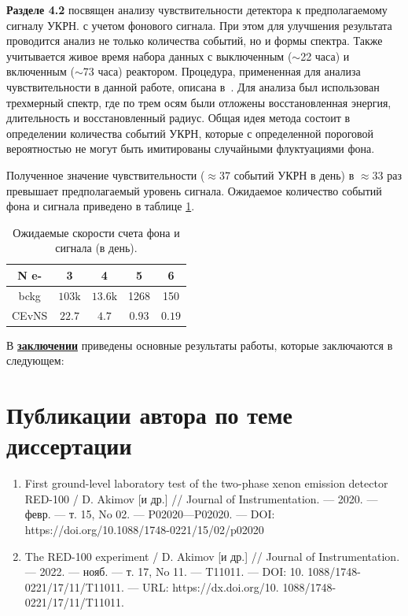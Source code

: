 \textbf{Разделе 4.2} посвящен анализу чувствительности детектора к предполагаемому сигналу УКРН. с учетом фонового сигнала. При этом для улучшения результата проводится анализ не только количества событий, но и формы спектра. Также учитывается живое время набора данных с выключенным ($\sim$22 часа) и включенным ($\sim$73 часа) реактором.
Процедура, примененная для анализа чувствительности в данной работе, описана в~\cite{Matt_thesis}. Для анализа был использован трехмерный спектр, где по трем осям были отложены восстановленная энергия, длительность и восстановленный радиус. Общая идея метода состоит в определении количества событий УКРН, которые с определенной пороговой вероятностью не могут быть имитированы случайными флуктуациями фона.

Полученное значение чувствительности ($\approx$37 событий УКРН в день) в $\approx$33 раз превышает предполагаемый уровень сигнала. Ожидаемое количество событий фона и сигнала приведено в таблице \ref{cevnscount}.

\begin{table}[hbt]
    \centering
    \caption{Ожидаемые скорости счета фона и сигнала (в день).}
    
\begin{tabular}{|c|c|c|c|c|}
\hline N e- & 3 & 4 & 5 & 6 \\
\hline bckg & $103 \mathrm{k}$ & $13.6 \mathrm{k}$ & 1268 & 150 \\
\hline CEvNS & $22.7$ & $4.7$ & $0.93$ & $0.19$ \\
\hline
\end{tabular}
\label{cevnscount}
\end{table}

В \underline{\textbf{заключении}} приведены основные результаты работы, которые заключаются в следующем:


\section*{Публикации автора по теме диссертации}
\begin{enumerate}
    \item First ground-level laboratory test of the two-phase xenon emission detector
RED-100 / D. Akimov [и др.] // Journal of Instrumentation. — 2020. —
февр. — т. 15, No 02. — P02020—P02020. — DOI: https://doi.org/10.1088/1748-0221/15/02/p02020
    \item The RED-100 experiment / D. Akimov [и др.] // Journal of
Instrumentation. — 2022. — нояб. — т. 17, No 11. — T11011. — DOI: 10.
1088/1748- 0221/17/11/T11011. — URL: https://dx.doi.org/10.
1088/1748-0221/17/11/T11011.
\end{enumerate}

